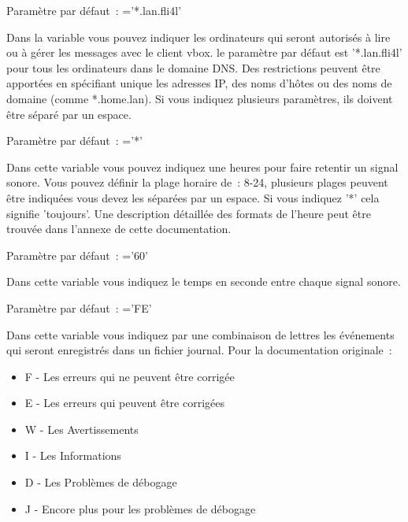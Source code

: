 \begin{description}
    Paramètre par défaut~: ='*.lan.fli4l'

    Dans la variable  vous pouvez indiquer les ordinateurs qui seront
	autorisés à lire ou à gérer les messages avec le client vbox. le paramètre par défaut est
	'*.lan.fli4l' pour tous les ordinateurs dans le domaine DNS. Des restrictions peuvent être
	apportées en spécifiant unique les adresses IP, des noms d'hôtes ou des noms de domaine
	(comme *.home.lan). Si vous indiquez plusieurs paramètres, ils doivent être séparé par un espace.




    Paramètre par défaut~: ='*'

    Dans cette variable vous pouvez indiquez une heures pour faire retentir un signal sonore.
	Vous pouvez définir la plage horaire de~: 8-24, plusieurs plages peuvent être indiquées vous
	devez les séparées par un espace. Si vous indiquez '*' cela signifie 'toujours'. Une description
	détaillée des formats de l'heure peut être trouvée dans l'annexe de cette documentation.



    Paramètre par défaut~: ='60'

    Dans cette variable vous indiquez le temps en seconde entre chaque signal sonore.


    Paramètre par défaut~: ='FE'

    Dans cette variable vous indiquez par une combinaison de lettres les événements qui seront
	enregistrés dans un fichier journal. Pour la documentation originale~:
    \begin{itemize}
        \item F - Les erreurs qui ne peuvent être corrigée
        \item E - Les erreurs qui peuvent être corrigées
        \item W - Les Avertissements
        \item I - Les Informations
        \item D - Les Problèmes de débogage
        \item J - Encore plus pour les problèmes de débogage
    \end{itemize}


\end{description}
